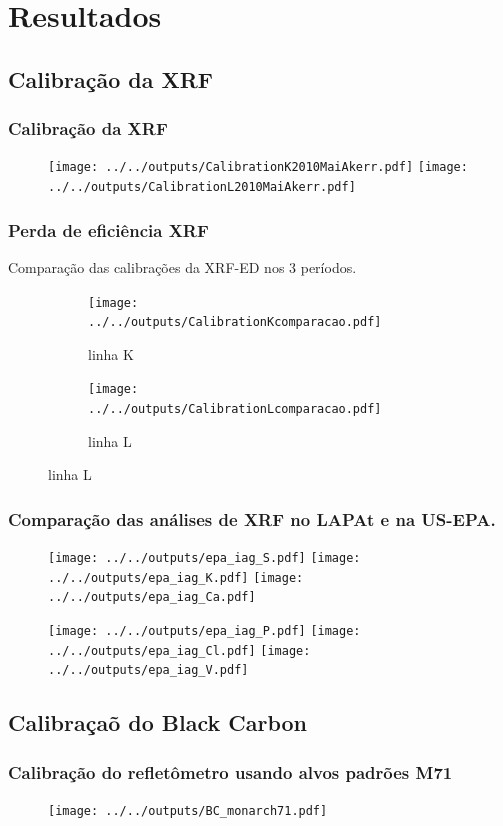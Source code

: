 \section{Resultados}

\subsection{Calibração da XRF}

\begin{frame}
  \frametitle{Calibração da XRF}
  \begin{figure}
      \centering
      \texttt{[image: ../../outputs/CalibrationK2010MaiAkerr.pdf]}
      \texttt{[image: ../../outputs/CalibrationL2010MaiAkerr.pdf]}
  \end{figure}
\end{frame}

\begin{frame}
  \frametitle{Perda de eficiência XRF}
  Comparação das calibrações da XRF-ED nos 3 períodos.
  \begin{figure}[H]
    \begin{subfigure}[b]{0.5\textwidth}
      \texttt{[image: ../../outputs/CalibrationKcomparacao.pdf]}
      \caption{linha K}
    \end{subfigure}%
    \begin{subfigure}[b]{0.5\textwidth}
      \texttt{[image: ../../outputs/CalibrationLcomparacao.pdf]}
      \caption{linha L}
    \end{subfigure}
  \end{figure}
\end{frame}


\begin{frame}
  \frametitle{Comparação das análises de XRF no LAPAt e na US-EPA.}
  \begin{figure}[H]
    \centering
      \texttt{[image: ../../outputs/epa\_iag\_S.pdf]}
      \texttt{[image: ../../outputs/epa\_iag\_K.pdf]}
      \texttt{[image: ../../outputs/epa\_iag\_Ca.pdf]}
  \end{figure}
    \begin{figure}[H]
    	\centering
    	\texttt{[image: ../../outputs/epa\_iag\_P.pdf]}
    	\texttt{[image: ../../outputs/epa\_iag\_Cl.pdf]}
    	\texttt{[image: ../../outputs/epa\_iag\_V.pdf]}
    \end{figure}
\end{frame}

\subsection{Calibraçaõ do Black Carbon}
\begin{frame}
  \frametitle{Calibração do refletômetro usando alvos padrões M71}
  \begin{figure}[H]
    \centering
    \texttt{[image: ../../outputs/BC\_monarch71.pdf]}
  \end{figure}
\end{frame}

